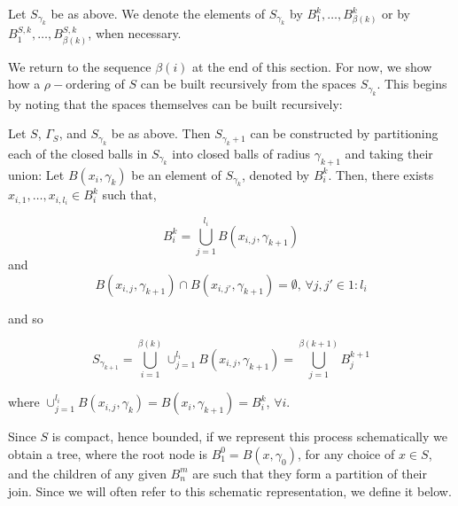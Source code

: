 \begin{notation}
Let $S_{\gamma_k}$ be as above. We denote the elements of $S_{\gamma_k}$ by $B^k_1, \ldots, B^k_{\beta(k)}$ or by $B^{S,k}_1, \ldots, B^{S,k}_{\beta(k)}$, when necessary.
\end{notation}


We return to the sequence $\beta(i)$ at the end of this section. For now, we show how a $\rho-$ordering of $S$ can be built recursively from the spaces $S_{\gamma_k}$. This begins by noting that the spaces themselves can be built recursively:\\

\begin{observation}
Let $S$, $\Gamma_S$, and $S_{\gamma_k}$ be as above. Then $S_{\gamma_k+1}$ can be constructed by partitioning each of the closed balls in $S_{\gamma_k}$ into closed balls of radius $\gamma_{k+1}$ and taking their union:  Let $B(x_i, \gamma_k)$  be an element of $S_{\gamma_k}$, denoted by  $B^k_i$. Then, there exists $x_{i,1},\ldots, x_{i,l_{i}} \in B^k_i$ such that,

\[B^k_i=  \bigcup_{j=1}^{l_i} B(x_{i,j}, \gamma_{k+1})\] and  \[B(x_{i,j}, \gamma_{k+1}) \cap B(x_{i,j'}, \gamma_{k+1}) = \emptyset \text{, }\forall j,j' \in 1:l_i\] 

and so

\[S_{\gamma_{k+1}} =  \bigcup_{i=1}^{\beta(k)}   \cup_{j=1}^{l_i} B(x_{i,j}, \gamma_{k+1}) = \bigcup^{\beta(k+1)}_{j=1}B^{k+1}_{j}\] 


where $\cup_{j=1}^{l_i} B(x_{i,j},\gamma_{k})=B(x_i, \gamma_{k+1}) = B^k_i$, $\forall i$.
\end{observation}

Since $S$ is compact, hence bounded, if we represent this process schematically we obtain a tree, where the root node is $B^0_1=B(x,\gamma_0)$, for any choice of $x \in S$, and the children of any given $B^m_n$ are such that they form a partition of their join.  Since we will often refer to this schematic representation, we define it below.\\

